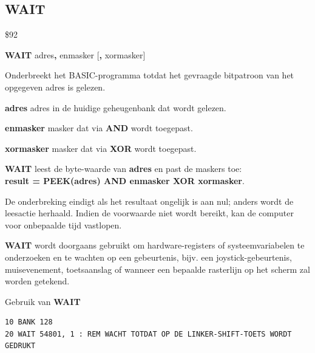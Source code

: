 \subsection{WAIT}
\begin{description}[leftmargin=2cm,style=nextline]
\item [Token:]    \$92

\item [Formaat:]   {\bf WAIT} adres{\bf,} enmasker [{\bf,} xormasker]

\item [Gebruik:]    Onderbreekt het BASIC-programma totdat het gevraagde bitpatroon van het opgegeven adres is gelezen.

                  {\bf adres} adres in de huidige geheugenbank dat wordt gelezen.

                  {\bf enmasker} masker dat via {\bf AND} wordt toegepast.

                  {\bf xormasker} masker dat via {\bf XOR} wordt toegepast.

                  {\bf WAIT} leest de byte-waarde van {\bf adres} en past de maskers toe: \\
                  {\bf result = PEEK(adres) AND enmasker XOR xormasker}.

                  De onderbreking eindigt als het resultaat ongelijk is aan nul; anders wordt de leesactie herhaald. Indien de voorwaarde niet wordt bereikt, kan de computer voor onbepaalde tijd vastlopen.

\item [Opmerkingen:]  {\bf WAIT} wordt doorgaans gebruikt om hardware-registers of systeemvariabelen te onderzoeken en te wachten op een gebeurtenis, bijv. een joystick-gebeurtenis, muisevenement, toetsaanslag of wanneer een bepaalde rasterlijn op het scherm zal worden getekend.

\item [Voorbeeld:]  Gebruik van {\bf WAIT}

\begin{tcolorbox}[colback=black,coltext=white]
\verbatimfont{\codefont}
\begin{verbatim}
10 BANK 128
20 WAIT 54801, 1 : REM WACHT TOTDAT OP DE LINKER-SHIFT-TOETS WORDT GEDRUKT
\end{verbatim}
\end{tcolorbox}
\end{description}


